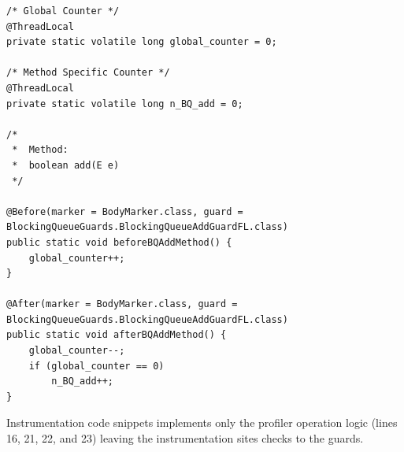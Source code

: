 \documentclass[]{usiinfthesis}
\begin{document}
\vspace*{0.5cm}
\begin{verbatim}
/* Global Counter */
@ThreadLocal
private static volatile long global_counter = 0;

/* Method Specific Counter */
@ThreadLocal
private static volatile long n_BQ_add = 0;

/*
 *  Method:
 *  boolean add(E e)
 */

@Before(marker = BodyMarker.class, guard = BlockingQueueGuards.BlockingQueueAddGuardFL.class)
public static void beforeBQAddMethod() {
    global_counter++;
}

@After(marker = BodyMarker.class, guard = BlockingQueueGuards.BlockingQueueAddGuardFL.class)
public static void afterBQAddMethod() {
    global_counter--;
    if (global_counter == 0)
        n_BQ_add++;
}
\end{verbatim}
\vspace*{0.5cm}
Instrumentation code snippets implements only the profiler operation logic (lines 16, 21, 22, and 23) leaving the instrumentation sites checks to the guards.

\end{document}

